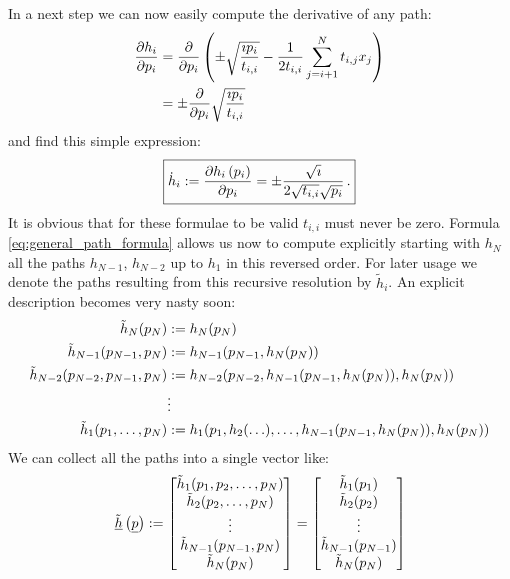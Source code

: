 \documentclass[a4paper,10pt]{article}
\begin{document}
In a next step we can now easily compute the derivative of any path:
\begin{equation}
\begin{split}
  \frac{\partial h_i}{\partial p_i}
  & = \frac{\partial }{\partial p_i}
      \left(\pm \sqrt{\frac{\imath p_i}{t_{i,i}}} -\frac{1}{2 t_{i,i}} \sum_{j=i+1}^{N} t_{i,j} x_j\right) \\
  & = \pm \frac{\partial }{\partial p_i} \sqrt{\frac{\imath p_i}{t_{i,i}}}
\end{split}
\end{equation}
and find this simple expression:
\begin{equation} \label{eq:general_path_derivative_formula}
\boxed{
  \dot{h}_i := \frac{\partial h_i\left(p_i\right)}{\partial p_i}
  = \pm \frac{\sqrt{\imath}}{2 \sqrt{t_{i,i}}\sqrt{p_i}} \,.
}
\end{equation}
It is obvious that for these formulae to be valid
$t_{i,i}$ must never be zero.
Formula \eqref{eq:general_path_formula} allows us now to compute explicitly
starting with $h_N$ all the paths $h_{N-1}$, $h_{N-2}$ up to $h_1$ in
this reversed order.
For later usage we denote the paths resulting from this
recursive resolution by $\tilde{h}_i$. An explicit description
becomes very nasty soon:
\begin{equation*}
\begin{split}
  \tilde{h}_N(p_N)
  & := h_N(p_N) \\
  \tilde{h}_{N-1}(p_{N-1}, p_N)
  & := h_{N-1}(p_{N-1},
                    h_N(p_N)
                   ) \\
  \tilde{h}_{N-2}(p_{N-2}, p_{N-1}, p_N)
  & := h_{N-2}(p_{N-2},
                    h_{N-1}(p_{N-1},
                      h_N(p_N)
                    ),
                    h_N(p_N)
                   ) \\
  & \vdots \\
  \tilde{h}_1(p_1, \ldots, p_N)
  & := h_1(p_1,
                h_2(\ldots),
                \ldots,
                h_{N-1}(p_{N-1}, h_N(p_N)),
                h_N(p_N)
               )
\end{split}
\end{equation*}
We can collect all the paths into a single vector like:
\begin{equation}
 \underline{\tilde{h}}\left(\underline{p}\right) :=
 \begin{bmatrix}
  \tilde{h}_1(p_1, p_2, \ldots, p_N) \\
  \tilde{h}_2(p_2, \ldots, p_N) \\
  \vdots \\
  \tilde{h}_{N-1}(p_{N-1}, p_N) \\
  \tilde{h}_{N}(p_N) \\
 \end{bmatrix}
 =
 \begin{bmatrix}
  \tilde{h}_1(p_1) \\
  \tilde{h}_2(p_2) \\
  \vdots \\
  \tilde{h}_{N-1}(p_{N-1}) \\
  \tilde{h}_{N}(p_N) \\
 \end{bmatrix}
\end{equation}
\end{document}
